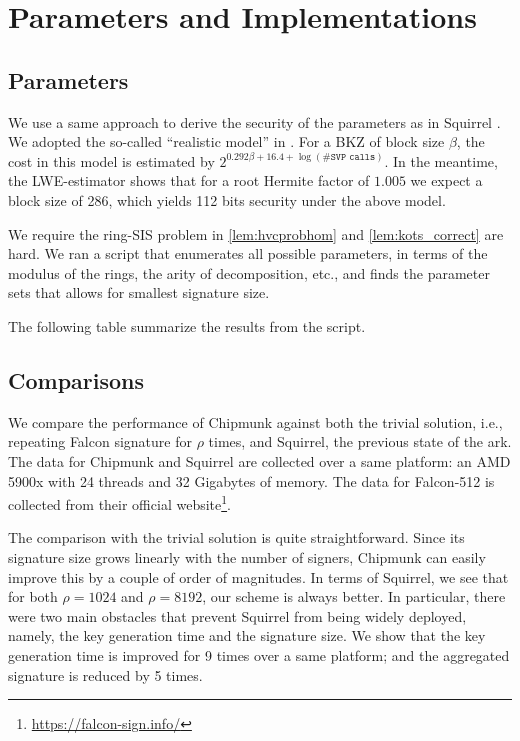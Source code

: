 \section{Parameters and Implementations}
\subsection{Parameters}
We use a same approach to derive the security of the parameters as in Squirrel \cite{CCS:FleSimZha22}.
We adopted the so-called ``realistic model'' in \cite{DBLP:conf/uss/AlkimDPS16}.
For a BKZ of block size $\beta$, the cost in this model is estimated by
$2^{0.292\beta+16.4+\log(\#\texttt{SVP calls})}$. 
In the meantime, the LWE-estimator \cite{DBLP:journals/jmc/AlbrechtPS15}
shows that for a root Hermite factor of $1.005$ we expect a block size of 286, which yields 112 bits security under the above model. 

We require the ring-SIS problem in \ref{lem:hvcprobhom} and \ref{lem:kots_correct} are hard. We ran a script that enumerates all possible 
parameters, in terms of the modulus of the rings, the arity of decomposition, etc., and finds the parameter sets that
allows for smallest signature size.

The following table summarize the results from the script.

% 
\subsection{Comparisons}\label{ss:comparison}

We compare the performance of Chipmunk against both the trivial solution, i.e., repeating Falcon signature for $\rho$ times, and
Squirrel, the previous state of the ark. The data for Chipmunk and Squirrel are collected over a same platform: an AMD 5900x with 24 threads
and 32 Gigabytes of memory. The data for Falcon-512 is collected from their official website\footnote{\url{https://falcon-sign.info/}}.

The comparison with the trivial solution is quite straightforward. Since its signature size grows linearly with the number of signers,
Chipmunk can easily improve this by a couple of order of magnitudes.
In terms of Squirrel, we see that for both $\rho = 1024$ and $\rho = 8192$, our scheme is always better. 
In particular, there were two main obstacles that prevent Squirrel from being widely deployed, namely, the key generation time
and the signature size. We show that the key generation time is improved for 9 times over a same platform; and the 
aggregated signature is reduced by 5 times. 

